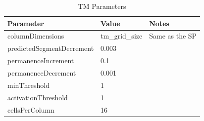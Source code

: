 \begin{table}[H]
    \centering
    \begin{tabularx}{\linewidth}{@{}XlX@{}}
        \toprule
        \textbf{Parameter}        & \textbf{Value} & \textbf{Notes} \\
        \midrule
        columnDimensions          & tm\_grid\_size & Same as the SP \\
        predictedSegmentDecrement & 0.003          &                \\
        permanenceIncrement       & 0.1            &                \\
        permanenceDecrement       & 0.001          &                \\
        minThreshold              & 1              &                \\
        activationThreshold       & 1              &                \\
        cellsPerColumn            & 16             &                \\
        \bottomrule
    \end{tabularx}
    \caption{TM Parameters}
    \label{tab:bb_tm_gridhtm_param}
\end{table}
